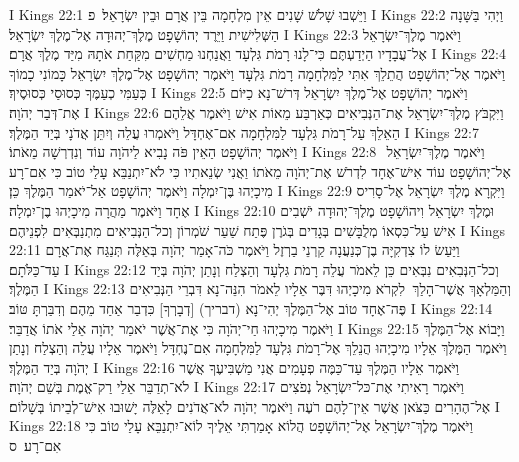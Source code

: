 I Kings 22:1	וַיֵּשְׁבוּ שָׁלֹשׁ שָׁנִים אֵין מִלְחָמָה בֵּין אֲרָם וּבֵין יִשְׂרָאֵל׃ {פ}
I Kings 22:2	וַיְהִי בַּשָּׁנָה הַשְּׁלִישִׁית וַיֵּרֶד יְהוֹשָׁפָט מֶלֶךְ־יְהוּדָה אֶל־מֶלֶךְ יִשְׂרָאֵל׃
I Kings 22:3	וַיֹּאמֶר מֶלֶךְ־יִשְׂרָאֵל אֶל־עֲבָדָיו הַיְדַעְתֶּם כִּי־לָנוּ רָמֹת גִּלְעָד וַאֲנַחְנוּ מַחְשִׁים מִקַּחַת אֹתָהּ מִיַּד מֶלֶךְ אֲרָם׃
I Kings 22:4	וַיֹּאמֶר אֶל־יְהוֹשָׁפָט הֲתֵלֵךְ אִתִּי לַמִּלְחָמָה רָמֹת גִּלְעָד וַיֹּאמֶר יְהוֹשָׁפָט אֶל־מֶלֶךְ יִשְׂרָאֵל כָּמוֹנִי כָמוֹךָ כְּעַמִּי כְעַמֶּךָ כְּסוּסַי כְּסוּסֶיךָ׃
I Kings 22:5	וַיֹּאמֶר יְהוֹשָׁפָט אֶל־מֶלֶךְ יִשְׂרָאֵל דְּרשׁ־נָא כַיּוֹם אֶת־דְּבַר יְהֹוָה׃
I Kings 22:6	וַיִּקְבֹּץ מֶלֶךְ־יִשְׂרָאֵל אֶת־הַנְּבִיאִים כְּאַרְבַּע מֵאוֹת אִישׁ וַיֹּאמֶר אֲלֵהֶם הַאֵלֵךְ עַל־רָמֹת גִּלְעָד לַמִּלְחָמָה אִם־אֶחְדָּל וַיֹּאמְרוּ עֲלֵה וְיִתֵּן אֲדֹנָי בְּיַד הַמֶּלֶךְ׃
I Kings 22:7	וַיֹּאמֶר יְהוֹשָׁפָט הַאֵין פֹּה נָבִיא לַיהֹוָה עוֹד וְנִדְרְשָׁה מֵאֹתוֹ׃
I Kings 22:8	וַיֹּאמֶר מֶלֶךְ־יִשְׂרָאֵל  אֶל־יְהוֹשָׁפָט עוֹד אִישׁ־אֶחָד לִדְרֹשׁ אֶת־יְהֹוָה מֵאֹתוֹ וַאֲנִי שְׂנֵאתִיו כִּי לֹא־יִתְנַבֵּא עָלַי טוֹב כִּי אִם־רָע מִיכָיְהוּ בֶּן־יִמְלָה וַיֹּאמֶר יְהוֹשָׁפָט אַל־יֹאמַר הַמֶּלֶךְ כֵּן׃
I Kings 22:9	וַיִּקְרָא מֶלֶךְ יִשְׂרָאֵל אֶל־סָרִיס אֶחָד וַיֹּאמֶר מַהֲרָה מִיכָיְהוּ בֶן־יִמְלָה׃
I Kings 22:10	וּמֶלֶךְ יִשְׂרָאֵל וִיהוֹשָׁפָט מֶלֶךְ־יְהוּדָה יֹשְׁבִים אִישׁ עַל־כִּסְאוֹ מְלֻבָּשִׁים בְּגָדִים בְּגֹרֶן פֶּתַח שַׁעַר שֹׁמְרוֹן וְכל־הַנְּבִיאִים מִתְנַבְּאִים לִפְנֵיהֶם׃
I Kings 22:11	וַיַּעַשׂ לוֹ צִדְקִיָּה בֶן־כְּנַעֲנָה קַרְנֵי בַרְזֶל וַיֹּאמֶר כֹּה־אָמַר יְהֹוָה בְּאֵלֶּה תְּנַגַּח אֶת־אֲרָם עַד־כַּלֹּתָם׃
I Kings 22:12	וְכל־הַנְּבִאִים נִבְּאִים כֵּן לֵאמֹר עֲלֵה רָמֹת גִּלְעָד וְהַצְלַח וְנָתַן יְהֹוָה בְּיַד הַמֶּלֶךְ׃
I Kings 22:13	וְהַמַּלְאָךְ אֲשֶׁר־הָלַךְ  לִקְרֹא מִיכָיְהוּ דִּבֶּר אֵלָיו לֵאמֹר הִנֵּה־נָא דִּבְרֵי הַנְּבִיאִים פֶּה־אֶחָד טוֹב אֶל־הַמֶּלֶךְ יְהִי־נָא (דבריך) [דְבָרְךָ] כִּדְבַר אַחַד מֵהֶם וְדִבַּרְתָּ טּוֹב׃
I Kings 22:14	וַיֹּאמֶר מִיכָיְהוּ חַי־יְהֹוָה כִּי אֶת־אֲשֶׁר יֹאמַר יְהֹוָה אֵלַי אֹתוֹ אֲדַבֵּר׃
I Kings 22:15	וַיָּבוֹא אֶל־הַמֶּלֶךְ וַיֹּאמֶר הַמֶּלֶךְ אֵלָיו מִיכָיְהוּ הֲנֵלֵךְ אֶל־רָמֹת גִּלְעָד לַמִּלְחָמָה אִם־נֶחְדָּל וַיֹּאמֶר אֵלָיו עֲלֵה וְהַצְלַח וְנָתַן יְהֹוָה בְּיַד הַמֶּלֶךְ׃
I Kings 22:16	וַיֹּאמֶר אֵלָיו הַמֶּלֶךְ עַד־כַּמֶּה פְעָמִים אֲנִי מַשְׁבִּיעֶךָ אֲשֶׁר לֹא־תְדַבֵּר אֵלַי רַק־אֱמֶת בְּשֵׁם יְהֹוָה׃
I Kings 22:17	וַיֹּאמֶר רָאִיתִי אֶת־כּל־יִשְׂרָאֵל נְפֹצִים אֶל־הֶהָרִים כַּצֹּאן אֲשֶׁר אֵין־לָהֶם רֹעֶה וַיֹּאמֶר יְהֹוָה לֹא־אֲדֹנִים לָאֵלֶּה יָשׁוּבוּ אִישׁ־לְבֵיתוֹ בְּשָׁלוֹם׃
I Kings 22:18	וַיֹּאמֶר מֶלֶךְ־יִשְׂרָאֵל אֶל־יְהוֹשָׁפָט הֲלוֹא אָמַרְתִּי אֵלֶיךָ לוֹא־יִתְנַבֵּא עָלַי טוֹב כִּי אִם־רָע׃ {ס}        
